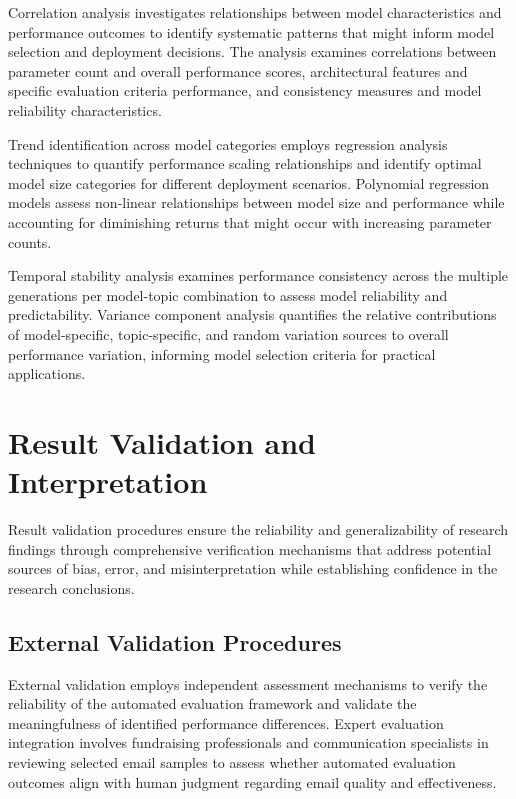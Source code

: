 Correlation analysis investigates relationships between model characteristics and performance outcomes to identify systematic patterns that might inform model selection and deployment decisions. The analysis examines correlations between parameter count and overall performance scores, architectural features and specific evaluation criteria performance, and consistency measures and model reliability characteristics.

Trend identification across model categories employs regression analysis techniques to quantify performance scaling relationships and identify optimal model size categories for different deployment scenarios. Polynomial regression models assess non-linear relationships between model size and performance while accounting for diminishing returns that might occur with increasing parameter counts.

Temporal stability analysis examines performance consistency across the multiple generations per model-topic combination to assess model reliability and predictability. Variance component analysis quantifies the relative contributions of model-specific, topic-specific, and random variation sources to overall performance variation, informing model selection criteria for practical applications.

\section{Result Validation and Interpretation}
\label{sec:result-validation}

Result validation procedures ensure the reliability and generalizability of research findings through comprehensive verification mechanisms that address potential sources of bias, error, and misinterpretation while establishing confidence in the research conclusions.

\subsection{External Validation Procedures}

External validation employs independent assessment mechanisms to verify the reliability of the automated evaluation framework and validate the meaningfulness of identified performance differences. Expert evaluation integration involves fundraising professionals and communication specialists in reviewing selected email samples to assess whether automated evaluation outcomes align with human judgment regarding email quality and effectiveness.


